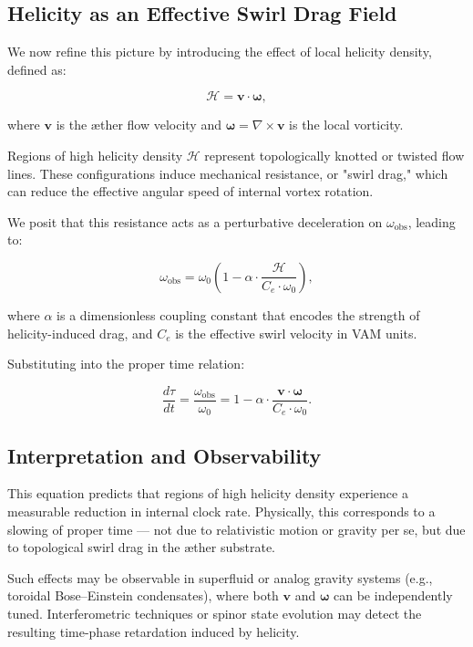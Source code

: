 \subsection*{Helicity as an Effective Swirl Drag Field}

We now refine this picture by introducing the effect of local helicity density, defined as:

\[
\mathcal{H} = \mathbf{v} \cdot \boldsymbol{\omega},
\]

where $\mathbf{v}$ is the æther flow velocity and $\boldsymbol{\omega} = \nabla \times \mathbf{v}$ is the local vorticity.

Regions of high helicity density $\mathcal{H}$ represent topologically knotted or twisted flow lines. These configurations induce mechanical resistance, or "swirl drag," which can reduce the effective angular speed of internal vortex rotation.

We posit that this resistance acts as a perturbative deceleration on $\omega_{\text{obs}}$, leading to:

\[
\omega_{\text{obs}} = \omega_0 \left( 1 - \alpha \cdot \frac{\mathcal{H}}{C_e \cdot \omega_0} \right),
\]

where $\alpha$ is a dimensionless coupling constant that encodes the strength of helicity-induced drag, and $C_e$ is the effective swirl velocity in VAM units.

Substituting into the proper time relation:

\[
\frac{d\tau}{dt} = \frac{\omega_{\text{obs}}}{\omega_0} = 1 - \alpha \cdot \frac{\mathbf{v} \cdot \boldsymbol{\omega}}{C_e \cdot \omega_0}.
\]

\subsection*{Interpretation and Observability}

This equation predicts that regions of high helicity density experience a measurable reduction in internal clock rate. Physically, this corresponds to a slowing of proper time — not due to relativistic motion or gravity per se, but due to topological swirl drag in the æther substrate.

Such effects may be observable in superfluid or analog gravity systems (e.g., toroidal Bose–Einstein condensates), where both $\mathbf{v}$ and $\boldsymbol{\omega}$ can be independently tuned. Interferometric techniques or spinor state evolution may detect the resulting time-phase retardation induced by helicity.

